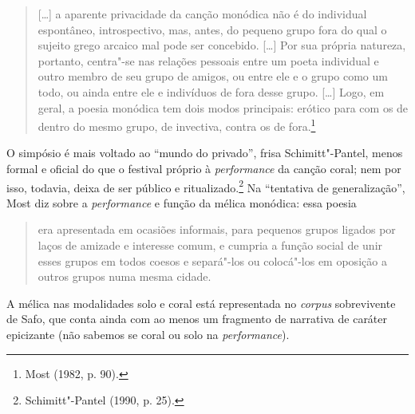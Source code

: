 \begin{quote}
\mbox[\ldots{}] a aparente privacidade da canção monódica não é do individual espontâneo,
introspectivo, mas, antes, do pequeno grupo fora do qual o sujeito grego
arcaico mal pode ser concebido. [\ldots{}] Por sua própria natureza, portanto,
centra"-se nas relações pessoais entre um poeta individual e outro membro de seu
grupo de amigos, ou entre ele e o grupo como um todo, ou ainda entre ele e
indivíduos de fora desse grupo. [\ldots{}] Logo, em geral, a poesia monódica tem
dois modos principais: erótico para com os de dentro do mesmo grupo, de
invectiva, contra os de fora.\footnote{ Most (1982, p. 90).}
\end{quote}

O simpósio é mais voltado ao “mundo do privado”, frisa Schimitt"-Pantel, menos
formal e oficial do que o festival próprio à \textit{performance}
da canção coral; nem por isso, todavia, deixa de ser público e
ritualizado.\footnote{ Schimitt"-Pantel (1990, p. 25).} Na
“tentativa de generalização”, Most diz sobre a \textit{performance} e função da
mélica monódica: essa poesia 

\begin{quote}
era apresentada em ocasiões informais, para
pequenos grupos ligados por laços de amizade e interesse comum, e cumpria a
função social de unir esses grupos em todos coesos e separá"-los ou colocá"-los
em oposição a outros grupos numa mesma cidade.
\end{quote}

A mélica nas modalidades solo e coral está representada no \textit{corpus} sobrevivente
de Safo, que conta ainda com ao menos um fragmento de narrativa de
caráter epicizante (não sabemos se coral ou solo na \textit{performance}).

